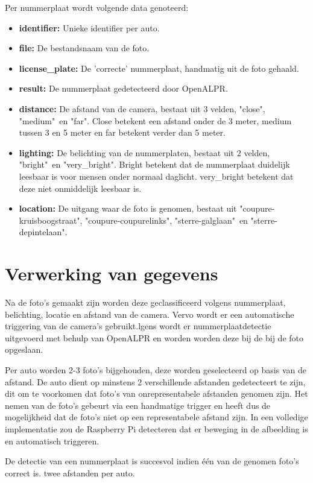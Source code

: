 Per nummerplaat wordt volgende data genoteerd:
\begin{itemize}
	\item \textbf{identifier:} Unieke identifier per auto.
	\item \textbf{file:} De bestandsnaam van de foto.
	\item \textbf{license\_plate:} De 'correcte' nummerplaat, handmatig uit de foto gehaald.
	\item \textbf{result:} De nummerplaat gedetecteerd door OpenALPR.
	\item \textbf{distance:} De afstand van de camera, bestaat uit 3 velden, "close", "medium"\ en "far". Close betekent een afstand onder de 3 meter, medium tussen 3 en 5 meter en far betekent verder dan 5 meter.
	\item \textbf{lighting:} De belichting van de nummerplaten, bestaat uit 2 velden, "bright"\ en "very\_bright". Bright betekent dat de nummerplaat duidelijk leesbaar is voor mensen onder normaal daglicht. very\_bright betekent dat deze niet onmiddelijk leesbaar is.
	\item \textbf{location:} De uitgang waar de foto is genomen, bestaat uit "coupure-kruisboogstraat", "coupure-coupurelinks", "sterre-galglaan"\ en "sterre-depintelaan".
\end{itemize}

\section{Verwerking van gegevens}

Na de foto's gemaakt zijn worden deze geclassificeerd volgens nummerplaat, belichting, locatie en afstand van de camera. Vervo wordt er een automatische triggering van de camera's gebruikt.lgens wordt er nummerplaatdetectie uitgevoerd met behulp van OpenALPR en worden worden deze bij de bij de foto opgeslaan.

Per auto worden 2-3 foto's bijgehouden, deze worden geselecteerd op basis van de afstand. De auto dient op minstens 2 verschillende afstanden gedetecteert te zijn, dit om te voorkomen dat foto's van onrepresentabele afstanden genomen zijn. Het nemen van de foto's gebeurt via een handmatige trigger en heeft dus de mogelijkheid dat de foto's niet op een representabele afstand zijn. In een volledige implementatie zou de Raspberry Pi detecteren dat er beweging in de afbeelding is en automatisch triggeren.

De detectie van een nummerplaat is succesvol indien één van de genomen foto's correct is.
twee afstanden per auto.

